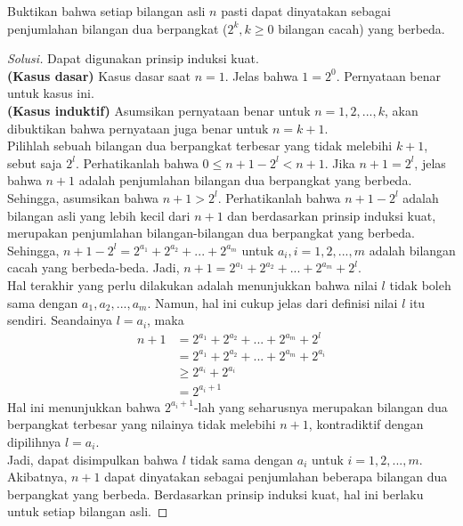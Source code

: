\documentclass[11pt]{scrartcl}
\begin{document}
\begin{example}
    Buktikan bahwa setiap bilangan asli $n$ pasti dapat dinyatakan sebagai penjumlahan bilangan dua berpangkat ($2^k, k \geq 0$ bilangan cacah) yang berbeda.     
\end{example}

\begin{proof}[Solusi]
Dapat digunakan prinsip induksi kuat.\\
\textbf{(Kasus dasar)} Kasus dasar saat $n = 1$. Jelas bahwa $1 = 2^0$. Pernyataan benar untuk kasus ini.\\
\textbf{(Kasus induktif)} Asumsikan pernyataan benar untuk $n = 1, 2, ...,k$, akan dibuktikan bahwa pernyataan juga benar untuk $n = k + 1$.\\
Pilihlah sebuah bilangan dua berpangkat terbesar yang tidak melebihi $k + 1$, sebut saja $2^l$. Perhatikanlah bahwa $0 \leq n + 1 - 2^l < n + 1$. Jika $n + 1 = 2^l$, jelas bahwa $n + 1$ adalah penjumlahan bilangan dua berpangkat yang berbeda. Sehingga, asumsikan bahwa $n + 1 > 2^l$. Perhatikanlah bahwa $n + 1 - 2^l$ adalah bilangan asli yang lebih kecil dari $n + 1$ dan berdasarkan prinsip induksi kuat, merupakan penjumlahan bilangan-bilangan dua berpangkat yang berbeda. Sehingga, $n + 1 - 2^l = 2^{a_1} + 2^{a_2} + ... + 2^{a_m}$ untuk $a_i, i = 1, 2, ..., m$ adalah bilangan cacah yang berbeda-beda. Jadi, $n + 1 = 2^{a_1} + 2^{a_2} + ... + 2^{a_m} + 2^l$. \\
Hal terakhir yang perlu dilakukan adalah menunjukkan bahwa nilai $l$ tidak boleh sama dengan $a_1, a_2, ..., a_m$. Namun, hal ini cukup jelas dari definisi nilai $l$ itu sendiri. Seandainya $l = a_i$, maka
\begin{align*}
    n + 1 &= 2^{a_1} + 2^{a_2} + ... + 2^{a_m} + 2^l\\
    &= 2^{a_1} + 2^{a_2} + ... + 2^{a_m} + 2^{a_i}\\
    &\geq 2^{a_i} + 2^{a_i}\\
    &= 2^{a_i + 1}
\end{align*}
Hal ini menunjukkan bahwa $2^{a_i + 1}$-lah yang seharusnya merupakan bilangan dua berpangkat terbesar yang nilainya tidak melebihi $n + 1$, kontradiktif dengan dipilihnya $l = a_i$.\\
Jadi, dapat disimpulkan bahwa $l$ tidak sama dengan $a_i$ untuk $i = 1, 2, ..., m$. Akibatnya, $n + 1$ dapat dinyatakan sebagai penjumlahan beberapa bilangan dua berpangkat yang berbeda. Berdasarkan prinsip induksi kuat, hal ini berlaku untuk setiap bilangan asli.
\end{proof}
\end{document}
